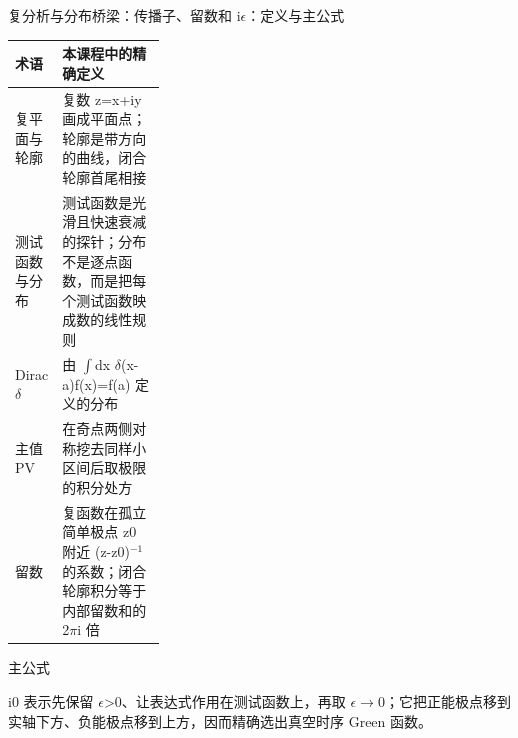 \begin{frame}[t]{复分析与分布桥梁：传播子、留数和 i\ensuremath{\epsilon}：定义与主公式}
\footnotesize\begin{tabularx}{\linewidth}{p{0.30\linewidth}Y}
\toprule 术语 & 本课程中的精确定义\\\midrule
{} 复平面与轮廓 & 复数 z=x+iy 画成平面点；轮廓是带方向的曲线，闭合轮廓首尾相接\\
 测试函数与分布 & 测试函数是光滑且快速衰减的探针；分布不是逐点函数，而是把每个测试函数映成数的线性规则\\
 Dirac \ensuremath{\delta} & 由 \ensuremath{\int}dx \ensuremath{\delta}(x-a)f(x)=f(a) 定义的分布\\
 主值 PV & 在奇点两侧对称挖去同样小区间后取极限的积分处方\\
 留数 & 复函数在孤立简单极点 z0 附近 (z-z0)\ensuremath{^{-1}} 的系数；闭合轮廓积分等于内部留数和的 2\ensuremath{\pi}i 倍\\
\bottomrule\end{tabularx}\vspace{0.15cm}
\begin{block}{ 主公式}\centering{}\end{block}
i0 表示先保留 \ensuremath{\epsilon}>0、让表达式作用在测试函数上，再取 \ensuremath{\epsilon}\ensuremath{\rightarrow}0；它把正能极点移到实轴下方、负能极点移到上方，因而精确选出真空时序 Green 函数。
\end{frame}

